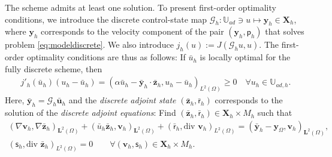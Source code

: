 \documentclass[final]{siamart0216}
\begin{document}
The scheme admits at least one solution. To present first-order optimality conditions, we introduce the discrete control-state map $\mathcal{G}_h: \mathbb{U}_{ad} \ni u \mapsto \mathbf{y}_h \in \mathbf{X}_h$, where $\mathbf{y}_h$ corresponds to the velocity component of the pair $(\mathbf{y}_h,\mathsf{p}_h)$ that solves problem \eqref{eq:modeldiscrete}. We also introduce $j_h(u):=J(\mathcal{G}_h u,u)$. The first-order optimality conditions are thus as follows: If $\bar{u}_{h}$ is locally optimal for the fully discrete scheme, then
\begin{eqnarray}\label{eq:variational_inequality_discrete}
j'_h(\bar{u}_h)(u_h-\bar{u}_h)=(\alpha \bar{u}_{h}-\bar{\mathbf{y}}_{h}\cdot \bar{\mathbf{z}}_{h},u_{h}-\bar{u}_{h})_{L^2(\Omega)}\geq 0\quad\forall u_{h}\in \mathbb{U}_{ad,h}.
\end{eqnarray}
Here, $\bar{\mathbf{y}}_h = \mathcal{G}_h \bar{\mathbf{u}}_{h}$ and the \emph{discrete adjoint state} $(\bar{\mathbf{z}}_{h},\bar{\mathsf{r}}_{h})$ corresponds to the solution of the \emph{discrete adjoint equations}: Find $(\bar{\mathbf{z}}_{h},\bar{\mathsf{r}}_{h})\in \mathbf{X}_h\times M_h$ such that
\begin{multline}
 \label{eq:brinkman_problem_adjoint_fully}
(\nabla \mathbf{v}_{h},\nabla \bar{\mathbf{z}}_{h})_{\mathbf{L}^2(\Omega)}
+
(\bar{u}_{h}\bar{\mathbf{z}}_{h}, \mathbf{v}_{h})_{\mathbf{L}^2(\Omega)}+
(\bar{\mathsf{r}}_{h},\text{div }\mathbf{v}_{h})_{L^2(\Omega)}
= (\bar{\mathbf{y}}_{h}
-
\mathbf{y}_{\Omega},\mathbf{v}_{h})_{\mathbf{L}^2(\Omega)},
\\
(\mathsf{s}_{h},\text{div }\bar{\mathbf{z}}_{h})_{L^2(\Omega)} =  0 \qquad \forall (\mathbf{v}_{h},\mathsf{s}_{h})\in \mathbf{X}_h\times M_h.
\end{multline}
\end{document}
